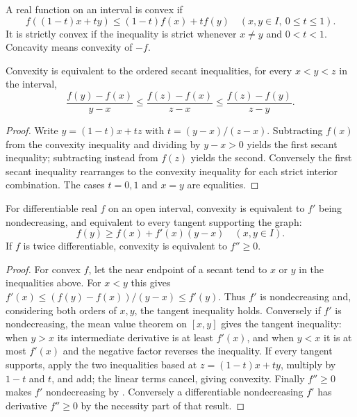 \begin{definition}
A real function on an interval is convex if
\[ f((1-t)x+ty)\le(1-t)f(x)+tf(y)\quad(x,y\in I,\ 0\le t\le1). \]
It is strictly convex if the inequality is strict whenever $x\ne y$ and $0<t<1$. Concavity means convexity of $-f$.
\end{definition}
\begin{proposition}
Convexity is equivalent to the ordered secant inequalities, for every $x<y<z$ in the interval,
\[ \frac{f(y)-f(x)}{y-x}\le\frac{f(z)-f(x)}{z-x}\le\frac{f(z)-f(y)}{z-y}. \]
\end{proposition}
\begin{proof}
Write $y=(1-t)x+tz$ with $t=(y-x)/(z-x)$. Subtracting $f(x)$ from the convexity inequality and dividing by $y-x>0$ yields the first secant inequality; subtracting instead from $f(z)$ yields the second. Conversely the first secant inequality rearranges to the convexity inequality for each strict interior combination. The cases $t=0,1$ and $x=y$ are equalities.
\end{proof}

\begin{theorem}
For differentiable real $f$ on an open interval, convexity is equivalent to $f'$ being nondecreasing, and equivalent to every tangent supporting the graph:
\[ f(y)\ge f(x)+f'(x)(y-x)\quad(x,y\in I). \]
If $f$ is twice differentiable, convexity is equivalent to $f''\ge0$.
\end{theorem}
\begin{proof}
For convex $f$, let the near endpoint of a secant tend to $x$ or $y$ in the inequalities above. For $x<y$ this gives $f'(x)\le(f(y)-f(x))/(y-x)\le f'(y)$. Thus $f'$ is nondecreasing and, considering both orders of $x,y$, the tangent inequality holds. Conversely if $f'$ is nondecreasing, the mean value theorem on $[x,y]$ gives the tangent inequality: when $y>x$ its intermediate derivative is at least $f'(x)$, and when $y<x$ it is at most $f'(x)$ and the negative factor reverses the inequality. If every tangent supports, apply the two inequalities based at $z=(1-t)x+ty$, multiply by $1-t$ and $t$, and add; the linear terms cancel, giving convexity. Finally $f''\ge0$ makes $f'$ nondecreasing by . Conversely a differentiable nondecreasing $f'$ has derivative $f''\ge0$ by the necessity part of that result.
\end{proof}

